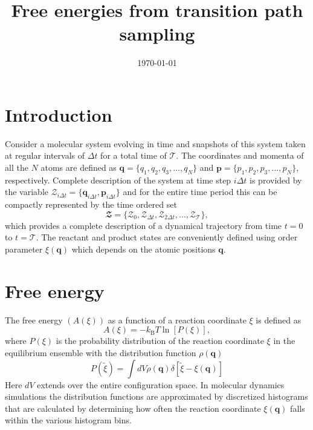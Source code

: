 \documentclass{article}
\title{Free energies from transition path sampling}
\date{\today}
\begin{document}
\maketitle
%
\section{Introduction}
Consider a molecular system evolving in time and snapshots of 
this system taken at regular intervals of $\Delta t$ for a total time of 
$\mathcal{T}$. The coordinates and momenta of all the $N$ atoms are defined as
$\textbf{q}=\{q_1,q_2,q_3,\ldots,q_N\}$ and $\textbf{p}=\{p_1,p_2,p_3,\ldots,p_N\}$, respectively. 
Complete description of the system at time step $i\Delta t$ is provided by the variable $\mathcal{Z}_{i\Delta t}=\{\mathbf{q}_{i\Delta t},\mathbf{p}_{i\Delta t}\}$ and for the entire time period this can be 
compactly represented by the time ordered set
\begin{equation}
\mathbfcal{Z} = \{\mathcal{Z}_0, \mathcal{Z}_{\Delta t}, \mathcal{Z}_{2\Delta t},
\ldots,\mathcal{Z}_{\mathcal{T}}\},
\end{equation}
which provides a complete description of a dynamical trajectory from time $t=0$ to $t=\mathcal{T}$.
The reactant and product states are conveniently defined using order parameter $\xi(\textbf{q})$ which 
depends on the atomic positions $\textbf{q}$. 

\section{Free energy}
The free energy $(A(\xi))$ as a function of a reaction coordinate $\xi$ is defined as 
\begin{equation}
A(\xi) = -k_{\text{B}}T\ln[P(\xi)],
\end{equation}
where $P(\xi)$ is the probability distribution of the reaction coordinate $\xi$ 
in the equilibrium ensemble with the distribution function $\rho(\textbf{q})$
\begin{equation}
P(\tilde{\xi}) = \int dV \rho(\textbf{q})\delta[\tilde{\xi}-\xi(\textbf{q})]
\end{equation}
Here $dV$ extends over the entire configuration space. In molecular dynamics simulations the 
distribution functions are approximated by discretized histograms that are calculated by determining 
how often the reaction coordinate $\xi({\textbf{q}})$ falls within the various histogram bins. 


\end{document}
